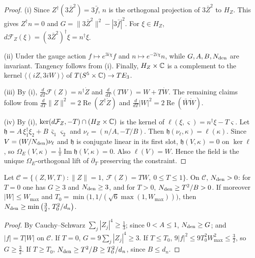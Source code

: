 \begin{proof}
(i) Since $Z^\dagger(3\bar Z^2)=3\bar f$, $n$ is the orthogonal projection of $3\bar Z^2$ to $H_Z$. This gives $Z^\dagger n=0$ and $G=\|3\bar Z^2\|^2-|3\bar f|^2$. For $\xi\in H_Z$, $d\mathcal F_Z(\xi)=(3\bar Z^2)^\dagger\xi=n^\dagger\xi$.

(ii) Under the gauge action $f\mapsto e^{3i\chi}f$ and $n\mapsto e^{-2i\chi}n$, while $G,A,B,N_{\rm den}$ are invariant. Tangency follows from (i). Finally, $H_Z\times\mathbb{C}$ is a complement to the kernel $\langle(iZ,3iW)\rangle$ of $T(S^5\times\mathbb{C})\to TE_3$.

(iii) By (i), $\frac{d}{dT}\mathcal F(Z)=n^\dagger\dot Z$ and $\frac{d}{dT}(TW)=W+T\dot W$. The remaining claims follow from $\frac{d}{dT}\|Z\|^2=2\operatorname{Re}(Z^\dagger\dot Z)$ and $\frac{d}{dT}|W|^2=2\operatorname{Re}(\bar W\dot W)$.

(iv) By (i), $\ker(d\mathcal F_Z,-T)\cap(H_Z\times\mathbb{C})$ is the kernel of $\ell(\xi,\varsigma)=n^\dagger\xi-T\varsigma$. Let $\mathfrak h=A\,\xi_1^\dagger\xi_2+B\,\bar\varsigma_1\varsigma_2$ and $\nu_\ell=(n/A,-T/B)$. Then $\mathfrak h(\nu_\ell,\kappa)=\ell(\kappa)$. Since $V=(W/N_{\rm den})\nu_\ell$ and $\mathfrak h$ is conjugate linear in its first slot, $\mathfrak h(V,\kappa)=0$ on $\ker\ell$, so $\Omega_E(V,\kappa)=\frac1\pi\operatorname{Im}\mathfrak h(V,\kappa)=0$. Also $\ell(V)=W$. Hence the field is the unique $\Omega_E$-orthogonal lift of $\partial_T$ preserving the constraint.
\end{proof}

\begin{lemma}[Denominator]\label{lem:rtc-denominator}
Let $\mathcal C=\{(Z,W,T):\|Z\|=1,\ \mathcal F(Z)=TW,\ 0\le T\le1\}$. On $\mathcal C$, $N_{\rm den}>0$: for $T=0$ one has $G\ge3$
and $N_{\rm den}\ge3$, and for $T>0$, $N_{\rm den}\ge T^2/B>0$. If moreover $|W|\le W_{\max}$ and
$T_0=\min\big(1,1/(\sqrt6\max(1,W_{\max}))\big)$, then $N_{\rm den}\ge\min\big(\frac32,\,T_0^2/d_n\big)$.
\end{lemma}

\begin{proof}
By Cauchy--Schwarz $\sum_j|Z_j|^4\ge\frac13$; since $0<A\le1$, $N_{\rm den}\ge G$; and $|f|=T|W|$ on $\mathcal C$. If $T=0$, $G=9\sum_j|Z_j|^4\ge3$. If $T\le T_0$, $9|f|^2\le9T_0^2W_{\max}^2\le\frac32$, so $G\ge\frac32$. If $T\ge T_0$, $N_{\rm den}\ge T^2/B\ge T_0^2/d_n$, since $B\le d_n$.
\end{proof}

